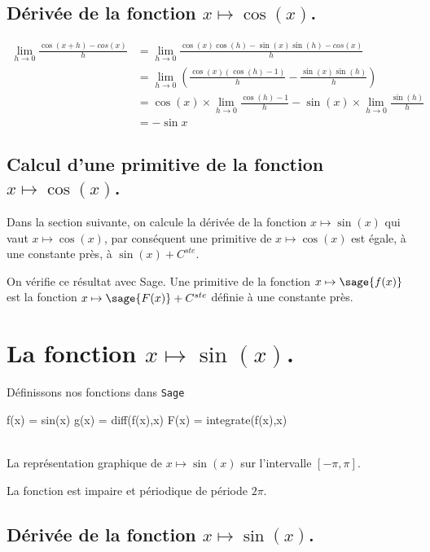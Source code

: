\documentclass[a4paper,landscape,17pt]{extreport} %
\begin{document}
\subsection{Dérivée de la fonction $x \mapsto \cos(x)$.}

\begin{align*}
\lim_{h\to 0} \frac{\cos(x+h)-cos(x)}{h}  
& = \lim_{h\to 0} \frac{\cos(x)\cos(h)-\sin(x)\sin(h)-cos(x)}{h} \\ 
& = \lim_{h\to 0} \left( \frac{\cos(x)(\cos(h)-1)}{h}-\frac{\sin(x)\sin(h)}{h} \right) \\  
& =  \cos(x) \times \lim_{h\to 0}\frac{\cos(h)-1}{h}- \sin(x) \times \lim_{h\to 0} \frac{\sin(h)}{h}\\  
& = -\sin{x}
\end{align*}

\subsection{Calcul d'une primitive de la fonction  $x \mapsto \cos(x)$.}

Dans la section suivante, on calcule la dérivée de la fonction $x \mapsto \sin(x)$ qui vaut $x \mapsto \cos(x)$, par conséquent une primitive de $x \mapsto \cos(x)$ est égale, à une constante près, à $  \sin(x) + C^{ste} $.

On vérifie ce résultat avec Sage.
Une primitive de la fonction $x \mapsto \sage{f(x)}$  est la fonction $x \mapsto \sage{F(x)} + C^{ste} $ définie à une constante près.


\section{La fonction  $x \mapsto \sin(x)$.}

Définissons nos fonctions dans {\texttt{Sage}}
\begin{sageblock}
    f(x) = sin(x)
    g(x) = diff(f(x),x)
    F(x) = integrate(f(x),x)
\end{sageblock}


\begin{center}
 \\
La représentation graphique de $x\mapsto \sin(x)$ sur l'intervalle $[-\pi, \pi]$.
\end{center}
La fonction est impaire et périodique de période $2 \pi$.

\subsection{Dérivée de la fonction $x \mapsto \sin(x)$.}
\end{document}
